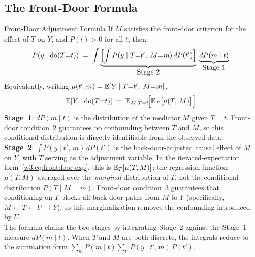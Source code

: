 \documentclass[master.tex]{subfiles}
\begin{document}
\subsection{The Front-Door Formula}
\label{w3:sec:frontdoor-formula}
\begin{thm}{Front-Door Adjustment Formula \citep{pearl1995causal}}
\label{w3:thm:frontdoor}
If $M$ satisfies the front-door criterion for the effect of $T$ on $Y$, and
$P(t) > 0$ for all $t$, then:
\begin{equation}
  P\!\left(y \mid \mathrm{do}(T{=}t)\right)
  \;=\; \int
      \underbrace{\Bigl[\int P(y \mid T{=}t',\;M{=}m)\,dP(t')\Bigr]}_{\displaystyle\text{Stage 2}}
      \;\underbrace{dP(m \mid t)}_{\displaystyle\text{Stage 1}}.
  \label{w3:eq:frontdoor}
\end{equation}
Equivalently, writing $\mu(t',m) = \mathbb{E}[Y \mid T{=}t',\;M{=}m]$,
\begin{equation}
  \mathbb{E}\!\left[Y \mid \mathrm{do}(T{=}t)\right]
  \;=\; \mathbb{E}_{M \mid T=t}\!\Bigl[\mathbb{E}_T\bigl[\mu(T,\,M)\bigr]\Bigr].
  \label{w3:eq:frontdoor-exp}
\end{equation}
\textbf{Stage~1}: $dP(m \mid t)$ is the distribution of the mediator $M$
given $T{=}t$.  Front-door condition~2 guarantees no confounding between
$T$ and $M$, so this conditional distribution is directly identifiable
from the observed data.\\[4pt]
\textbf{Stage~2}: $\int P(y \mid t',\,m)\,dP(t')$ is the back-door-adjusted
causal effect of $M$ on $Y$, with $T$ serving as the adjustment variable.
In the iterated-expectation form~\eqref{w3:eq:frontdoor-exp}, this is
$\mathbb{E}_T[\mu(T,M)]$: the regression function $\mu(T,M)$ averaged over the
\emph{marginal} distribution of $T$, not the conditional distribution
$P(T \mid M{=}m)$.  Front-door condition~3 guarantees that conditioning
on $T$ blocks all back-door paths from $M$ to $Y$ (specifically,
$M \leftarrow T \leftarrow U \to Y$), so this marginalization removes the
confounding introduced by $U$.\\[4pt]
The formula chains the two stages by integrating Stage~2 against the
Stage~1 measure $dP(m \mid t)$.  When $T$ and $M$ are both discrete,
the integrals reduce to the summation form
$\sum_m P(m\mid t)\sum_{t'} P(y\mid t',m)\,P(t')$.
\end{thm}
\end{document}
